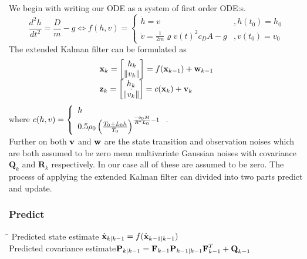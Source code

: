 We begin with writing our ODE as a system of first order ODE:s.
\begin{equation*}
	\frac{d^2h}{dt^2} = \frac{D}{m} - g \Longleftrightarrow f(h,v)=
	\left\lbrace
	\begin{array}{ll}
		\dot{h}= v & , h(t_0)=h_0 \\
		\dot{v}= \frac{1}{2m}\varrho v(t)^2c_DA-g& , v(t_0)=v_0
	\end{array}
	\right.
\end{equation*}
The extended Kalman filter can be formulated as
\begin{equation*}
	\begin{array}{l}
		\textbf{x}_k = \left[ \begin{matrix} h_{k} \\ \| v_{k} \| \end{matrix}\right]= f(\textbf{x}_{k-1})+\textbf{w}_{k-1}\\
		\textbf{z}_k = \left[ \begin{matrix} h_{k} \\ \dot{\| v_{k} \|} \end{matrix}\right]=  c(\textbf{x}_k)+\textbf{v}_k
	\end{array}
\end{equation*}
where $c(h,v) = \left\lbrace \begin{array}{l} h \\ 0.5\rho_0\left(\frac{T_0+L_0h}{T_0}\right)^{\frac{-g_0M} {R^*L_0}-1} \end{array} \right.$. \\
Further on both $\textbf{v}$ and $\textbf{w}$ are the state transition and observation noises which are both assumed to be zero mean multivariate Gaussian noises with covariance $\textbf{Q}_k$ and $\textbf{R}_k$ respectively. In our case all of these are assumed to be zero.
The process of applying the extended Kalman filter can divided into two parts predict and update.\\
\subsubsection*{Predict}
\begin{tabbing}
\hspace{6cm}\=\kill
Predicted state estimate \> $\hat{\textbf{x}}_{k|k-1}=f(\hat{\textbf{x}}_{k-1|k-1})$ \\
Predicted covariance estimate\>$\textbf{P}_{k|k-1} = \textbf{F}_{k-1}\textbf{P}_{k-1|k-1}\textbf{F}_{k-1}^T+\textbf{Q}_{k-1}$
\end{tabbing}

